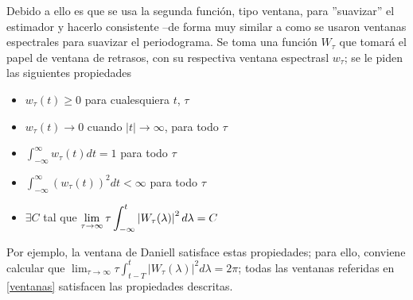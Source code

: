 
Debido a ello es que se usa la segunda funci\'on, tipo ventana, para ''suavizar'' el estimador 
y hacerlo consistente
--de forma muy similar a como se usaron ventanas espectrales para suavizar el periodograma.
Se toma una funci\'on $W_\tau$ que tomar\'a el papel de ventana de retrasos,
con su respectiva ventana espectrasl $w_\tau$; se le piden las siguientes propiedades

\begin{itemize}
\item $w_{\tau}(t) \geq 0$ para cualesquiera $t$, $\tau$
\item $w_{\tau}(t) \rightarrow 0$ cuando $\lvert t \lvert \rightarrow \infty$, para todo $\tau$
\item $\displaystyle \int_{-\infty}^{\infty} w_{\tau}(t) dt = 1$ para todo $\tau$
\item $\displaystyle \int_{-\infty}^{\infty} \left( w_{\tau}(t) \right)^{2} dt < \infty$ para todo $\tau$
\item $\exists C$ tal que  
$\displaystyle \lim_{\tau\rightarrow\infty} \tau \int_{-\infty}^{t} \left|  W_{\tau}(\lambda)  \right|^{2} d\lambda = C$
\end{itemize}


%

Por ejemplo, 
la ventana de Daniell satisface estas propiedades; para ello, conviene calcular que
$\lim_{\tau\rightarrow\infty}
\tau \int_{t-T}^{t} \lvert W_{\tau}(\lambda) \lvert^{2} d\lambda = 2\pi$;
todas las ventanas referidas en \ref{ventanas} satisfacen las propiedades descritas.

